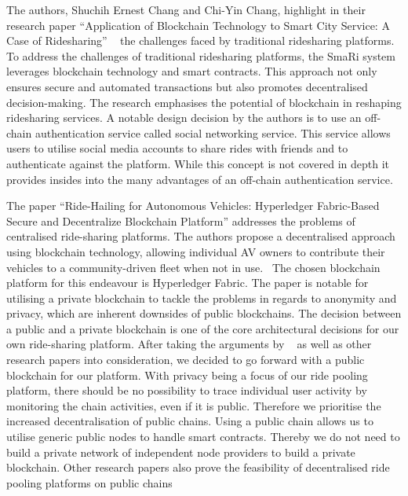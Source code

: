 The authors, Shuchih Ernest Chang and Chi-Yin Chang, highlight in their research paper ``Application of Blockchain Technology to Smart City Service: A Case of Ridesharing'' ~\cite{Chang.} the challenges faced by traditional ridesharing platforms. To address the challenges of traditional ridesharing platforms, the SmaRi system leverages blockchain technology and smart contracts. This approach not only ensures secure and automated transactions but also promotes decentralised decision-making. The research emphasises the potential of blockchain in reshaping ridesharing services. A notable design decision by the authors is to use an off-chain authentication service called social networking service. This service allows users to utilise social media accounts to share rides with friends and to authenticate against the platform. While this concept is not covered in depth it provides insides into the many advantages of an off-chain authentication service.

The paper ``Ride-Hailing for Autonomous Vehicles: Hyperledger Fabric-Based Secure and Decentralize Blockchain Platform'' addresses the problems of centralised ride-sharing platforms. The authors propose a decentralised approach using blockchain technology, allowing individual AV owners to contribute their vehicles to a community-driven fleet when not in use.~\cite{Shivers.} The chosen blockchain platform for this endeavour is Hyperledger Fabric. The paper is notable for utilising a private blockchain to tackle the problems in regards to anonymity and privacy, which are inherent downsides of public blockchains. The decision between a public and a private blockchain is one of the core architectural decisions for our own ride-sharing platform.  After taking the arguments by ~\cite{Shivers.} as well as other research papers into consideration, we decided to go forward with a public blockchain for our platform. With privacy being a focus of our ride pooling platform, there should be no possibility to trace individual user activity by monitoring the chain activities, even if it is public. Therefore we prioritise the increased decentralisation of public chains. Using a public chain allows us to utilise generic public nodes to handle smart contracts. Thereby we do not need to build a private network of independent node providers to build a private blockchain. Other research papers also prove the feasibility of decentralised ride pooling platforms on public chains ~\cite{Mahmoud.2022} ~\cite{Joseph.} ~\cite{Baza.52520205282020}

